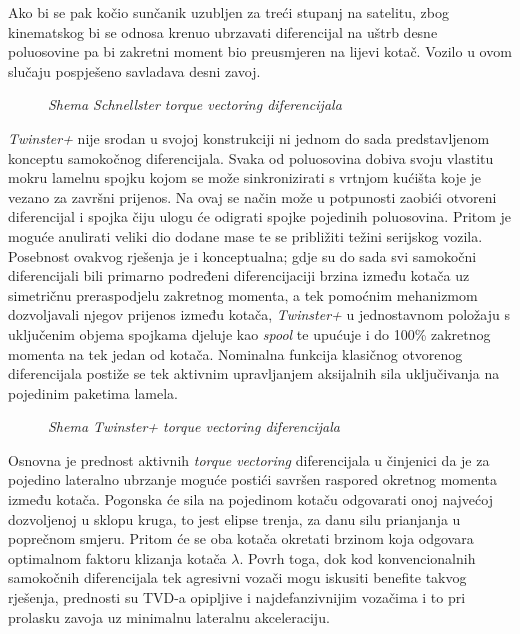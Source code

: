 \documentclass[11pt]{article}
\numberwithin{equation}{section}%
\begin{document}
Ako bi se pak kočio sunčanik uzubljen za treći stupanj na satelitu, zbog kinematskog bi se odnosa krenuo ubrzavati diferencijal na uštrb desne poluosovine pa bi zakretni moment bio preusmjeren na lijevi kotač. Vozilo u ovom slučaju pospješeno savladava desni zavoj.

\begin{figure}
 \centering
 \def\svgwidth{11,2cm}
 
 \caption{\textit{Shema Schnellster torque vectoring diferencijala} \cite{getrag}}
 \label{fig:schnee}
\end{figure}

\textit{Twinster+} nije srodan u svojoj konstrukciji ni jednom do sada predstavljenom konceptu samokočnog diferencijala. Svaka od poluosovina dobiva svoju vlastitu mokru lamelnu spojku kojom se može sinkronizirati s vrtnjom kućišta koje je vezano za završni prijenos. Na ovaj se način može u potpunosti zaobići otvoreni diferencijal i spojka čiju ulogu će odigrati spojke pojedinih poluosovina. Pritom je moguće anulirati veliki dio dodane mase te se približiti težini serijskog vozila. Posebnost ovakvog rješenja je i konceptualna; gdje su do sada svi samokočni diferencijali bili primarno podređeni diferencijaciji brzina između kotača uz simetričnu preraspodjelu zakretnog momenta, a tek pomoćnim mehanizmom dozvoljavali njegov prijenos između kotača, \textit{Twinster+} u jednostavnom položaju s uključenim objema spojkama djeluje kao \textit{spool} te upućuje i do 100\% zakretnog momenta na tek jedan od kotača. Nominalna funkcija klasičnog otvorenog diferencijala postiže se tek aktivnim upravljanjem aksijalnih sila uključivanja na pojedinim paketima lamela.

\begin{figure}
 \centering
 \def\svgwidth{11,2cm}
 
 \caption{\textit{Shema Twinster+ torque vectoring diferencijala} \cite{getrag}}
 \label{fig:twin}
\end{figure} 

Osnovna je prednost aktivnih \textit{torque vectoring} diferencijala u činjenici da je za pojedino lateralno ubrzanje moguće postići savršen raspored okretnog momenta između kotača. Pogonska će sila na pojedinom kotaču odgovarati onoj najvećoj dozvoljenoj u sklopu kruga, to jest elipse trenja, za danu silu prianjanja u poprečnom smjeru. Pritom će se oba kotača okretati brzinom koja odgovara optimalnom faktoru klizanja kotača $\lambda$. Povrh toga, dok kod konvencionalnih samokočnih diferencijala tek agresivni vozači mogu iskusiti benefite takvog rješenja, prednosti su TVD-a opipljive i najdefanzivnijim vozačima i to pri prolasku zavoja uz minimalnu lateralnu akceleraciju.
\end{document}
